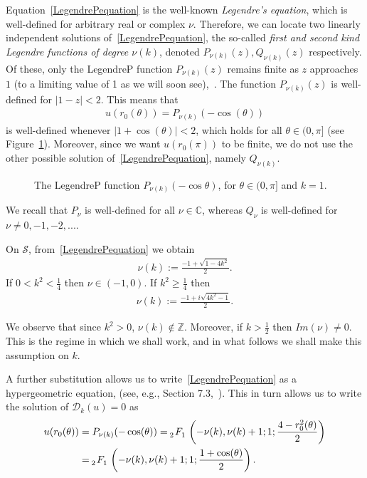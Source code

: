 \documentclass[final]{siamltex}
\renewcommand{\S} {\mathcal{S}}
\begin{document}
Equation~\eqref{LegendrePequation} is the well-known {\it Legendre's
equation}, which is well-defined for arbitrary real or complex $\nu$.
Therefore, we can locate two linearly independent solutions
of~\eqref{LegendrePequation}, the so-called {\it first and second kind
Legendre functions of degree $\nu(k)$}, denoted $ P_{\nu(k)}(z),
Q_{\nu(k)}(z)$ respectively. Of these, only the  LegendreP function
$P_{\nu(k)}(z)$ remains finite as $z$ approaches $1$ (to a limiting
value of 1 as we will soon see),~\cite{lebedev}.  The function
$P_{\nu(k)}(z)$ is well-defined for $|1-z|<2$.  This means that
\begin{align*}
  u(r_0(\theta)) =  P_{\nu(k)}(-\cos(\theta))
\end{align*}
is well-defined whenever $|1+\cos(\theta)|<2$, which holds for all
$\theta \in(0,\pi]$ (see Figure~\ref{f:legendreP}).  Moreover, since we
want $u(r_0(\pi))$ to be finite, we do not use the other possible
solution of~\eqref{LegendrePequation}, namely $Q_{\nu(k)}$.
\begin{figure}[htps]
  \centering
  
  \caption{\label{f:legendreP} The LegendreP function
  $P_{\nu(k)}(-\cos\theta)$, for $\theta \in (0,\pi]$ and $k=1$.}
\end{figure}  

We recall that $P_{\nu}$ is well-defined for all $\nu \in \mathbb{C}$, whereas $Q_\nu$ is well-defined for $\nu \not= 0,-1,-2,...$. 

On $\S$, from~\eqref{LegendrePequation} we obtain\begin{align*}  
  \nu(k):=\frac{-1+\sqrt{1-4k^2}}{2}.
\end{align*}
If $0<k^2<\frac{1}{4}$ then $\nu \in (-1,0)$. If $k^2\geq\frac{1}{4}$ then 
\begin{align*}  
  \nu(k):=\frac{-1+i\sqrt{4k^2-1}}{2}.
\end{align*}

We observe that since $k^{2}>0$, $\nu(k) \notin \mathbb{Z}$. Moreover,
if $k>\frac{1}{2}$ then $Im(\nu)\not=0$. This is the regime in which we
shall work, and in what follows we shall make this assumption on $k$.

A further substitution allows us to write~\eqref{LegendrePequation} as
a hypergeometric equation, (see, e.g., Section 7.3,~\cite{lebedev}).
This in turn allows us to write the solution of $\mathcal{D}_k(u)=0$ as 
\begin{align*} 
  u(r_0(\theta)) &= P_{\nu(k)}(-\cos(\theta)) = 
    \tensor[_2]{F}{_1}\left(-\nu(k), \nu(k)+  1; 1; 
      \frac{4-r_0^2(\theta)}{2}\right) \\
    &=\tensor[_2]{F}{_1}\left(-\nu(k), \nu(k)+  1; 1;
    \frac{1+\cos(\theta)}{2}\right).
\end{align*} 
\end{document}
